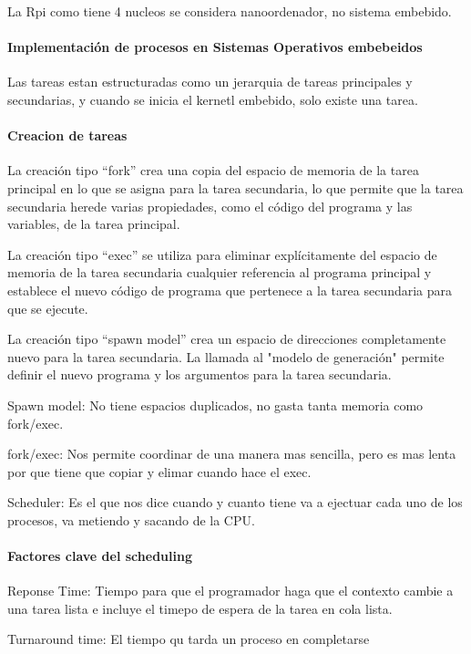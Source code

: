 \documentclass[12pt]{report} %
\begin{document}
La Rpi como tiene 4 nucleos se considera nanoordenador, no sistema embebido.


\paragraph{Implementación de procesos en Sistemas Operativos embebeidos}

Las tareas estan estructuradas como un jerarquia de tareas principales y secundarias, y cuando se inicia el kernetl embebido, solo existe una tarea.


\paragraph{Creacion de tareas}

La creación tipo “fork” crea una copia del espacio de memoria de la tarea principal en lo que se asigna para la tarea secundaria, lo que permite que la tarea secundaria herede varias propiedades, como el código del programa y las variables, de la tarea principal.

La creación tipo “exec” se utiliza para eliminar explícitamente del espacio de memoria de la tarea secundaria cualquier referencia al programa principal y establece el nuevo código de programa que pertenece a la tarea secundaria para que se ejecute.

La creación tipo “spawn model” crea un espacio de direcciones completamente nuevo para la tarea secundaria. La llamada al "modelo de generación" permite definir el nuevo programa y los argumentos para la tarea secundaria. 

Spawn model: No tiene espacios duplicados, no gasta tanta memoria como fork/exec.

fork/exec: Nos permite coordinar de una manera mas sencilla, pero es mas lenta por que tiene que copiar y elimar cuando hace el exec.

Scheduler: Es el que nos dice cuando y cuanto tiene va a ejectuar cada uno de los procesos, va metiendo y sacando de la CPU.


\paragraph{Factores clave del scheduling}

Reponse Time: Tiempo para que el programador haga que el contexto cambie a una tarea lista e incluye el timepo de espera de la tarea en cola lista.

Turnaround time: El tiempo qu tarda un proceso en completarse
\end{document}
